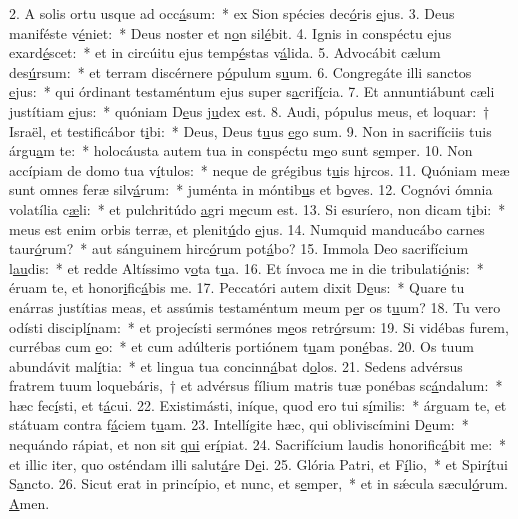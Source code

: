 2. A solis ortu usque ad occ\uline{á}sum:~* ex Sion spécies dec\uline{ó}ris \uline{e}jus.
3. Deus maniféste v\uline{é}niet:~* Deus noster et n\uline{o}n sil\uline{é}bit.
4. Ignis in conspéctu ejus exard\uline{é}scet:~* et in circúitu ejus temp\uline{é}stas v\uline{á}lida.
5. Advocábit cælum des\uline{ú}rsum:~* et terram discérnere p\uline{ó}pulum s\uline{u}um.
6. Congregáte illi sanctos \uline{e}jus:~* qui órdinant testaméntum ejus super s\uline{a}crif\uline{í}cia.
7. Et annuntiábunt cæli justítiam \uline{e}jus:~* quóniam D\uline{e}us j\uline{u}dex est.
8. Audi, pópulus meus, et loquar:~† Israël, et testificábor t\uline{i}bi:~* Deus, Deus t\uline{u}us \uline{e}go sum.
9. Non in sacrifíciis tuis árgu\uline{a}m te:~* holocáusta autem tua in conspéctu m\uline{e}o sunt s\uline{e}mper.
10. Non accípiam de domo tua v\uline{í}tulos:~* neque de grégibus t\uline{u}is h\uline{i}rcos.
11. Quóniam meæ sunt omnes feræ silv\uline{á}rum:~* juménta in móntib\uline{u}s et b\uline{o}ves.
12. Cognóvi ómnia volatília c\uline{æ}li:~* et pulchritúdo \uline{a}gri m\uline{e}cum est.
13. Si esuríero, non dicam t\uline{i}bi:~* meus est enim orbis terræ, et plenit\uline{ú}do \uline{e}jus.
14. Numquid manducábo carnes taur\uline{ó}rum?~* aut sánguinem hirc\uline{ó}rum pot\uline{á}bo?
15. Immola Deo sacrifícium l\uline{au}dis:~* et redde Altíssimo v\uline{o}ta t\uline{u}a.
16. Et ínvoca me in die tribulati\uline{ó}nis:~* éruam te, et honor\uline{i}fic\uline{á}bis me.
17. Peccatóri autem dixit D\uline{e}us:~* Quare tu enárras justítias meas, et assúmis testaméntum meum p\uline{e}r os t\uline{u}um?
18. Tu vero odísti discipl\uline{í}nam:~* et projecísti sermónes m\uline{e}os retr\uline{ó}rsum:
19. Si vidébas furem, currébas cum \uline{e}o:~* et cum adúlteris portiónem t\uline{u}am pon\uline{é}bas.
20. Os tuum abundávit mal\uline{í}tia:~* et lingua tua concinn\uline{á}bat d\uline{o}los.
21. Sedens advérsus fratrem tuum loquebáris,~† et advérsus fílium matris tuæ ponébas sc\uline{á}ndalum:~* hæc fec\uline{í}sti, et t\uline{á}cui.
22. Existimásti, iníque, quod ero tui s\uline{í}milis:~* árguam te, et státuam contra f\uline{á}ciem t\uline{u}am.
23. Intellígite hæc, qui obliviscímini D\uline{e}um:~* nequándo rápiat, et non sit \uline{qui} er\uline{í}piat.
24. Sacrifícium laudis honorific\uline{á}bit me:~* et illic iter, quo osténdam illi salut\uline{á}re D\uline{e}i.
25. Glória Patri, et F\uline{í}lio,~* et Spir\uline{í}tui S\uline{a}ncto.
26. Sicut erat in princípio, et nunc, et s\uline{e}mper,~* et in sǽcula sæcul\uline{ó}rum. \uline{A}men.

